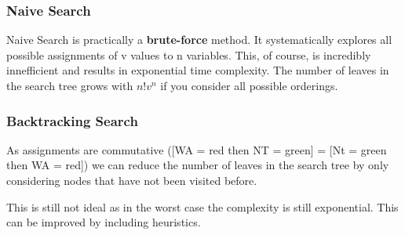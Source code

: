 \documentclass[
../EiKI_Summary.tex,
]
{subfiles}
\begin{document}
\subsubsection{Naive Search}
Naive Search is practically a \textbf{brute-force} method. It systematically explores all possible assignments of v values to n variables. This, of course, is incredibly innefficient and results in exponential time complexity. The number of leaves in the search tree grows with $n!v^n$ if you consider all possible orderings.

\subsubsection{Backtracking Search}
As assignments are commutative ([WA = red then NT = green] = [Nt = green then WA = red]) we can reduce the number of leaves in the search tree by only considering nodes that have not been visited before.

\begin{codebox}
    \begin{algorithm}[H]

    \end{algorithm}
\end{codebox}

This is still not ideal as in the worst case the complexity is still exponential. This can be improved by including heuristics.
\end{document}
